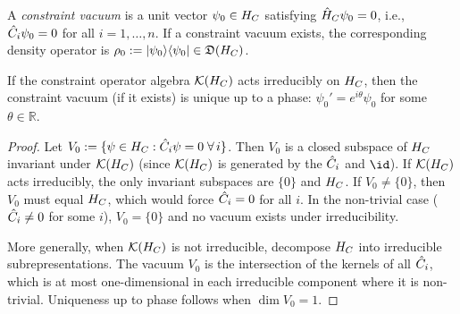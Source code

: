 \begin{definition}
\label{def:5.8}
A \emph{constraint vacuum} is a unit vector
$\psi_0 \in H_C$ satisfying $\hat{H}_C\psi_0 = 0$, i.e.,
$\hat{C}_i\psi_0 = 0$ for all $i = 1, \ldots, n$.  If a constraint
vacuum exists, the corresponding density operator is
$\rho_0 := |\psi_0\rangle\langle\psi_0| \in \mathfrak{D}(H_C)$.
\end{definition}

\begin{lemma}
\label{lem:5.5}
If the constraint operator algebra $\mathcal{K}(H_C)$ acts irreducibly on
$H_C$, then the constraint vacuum \textup{(}if it exists\textup{)} is
unique up to a phase: $\psi_0' = e^{i\theta}\psi_0$ for some
$\theta \in \mathbb{R}$.
\end{lemma}

\begin{proof}
Let $V_0 := \{\psi \in H_C : \hat{C}_i\psi = 0 \;\forall\, i\}$.
Then $V_0$ is a closed subspace of $H_C$ invariant under $\mathcal{K}(H_C)$
(since $\mathcal{K}(H_C)$ is generated by the $\hat{C}_i$ and $\id$).  If
$\mathcal{K}(H_C)$ acts irreducibly, the only invariant subspaces are $\{0\}$
and $H_C$.  If $V_0 \neq \{0\}$, then $V_0$ must equal $H_C$, which
would force $\hat{C}_i = 0$ for all $i$.  In the non-trivial case
($\hat{C}_i \neq 0$ for some $i$), $V_0 = \{0\}$ and no vacuum exists
under irreducibility.

More generally, when $\mathcal{K}(H_C)$ is not irreducible, decompose $H_C$ into
irreducible subrepresentations.  The vacuum $V_0$ is the intersection of
the kernels of all $\hat{C}_i$, which is at most one-dimensional in each
irreducible component where it is non-trivial.  Uniqueness up to phase
follows when $\dim V_0 = 1$.
\end{proof}

